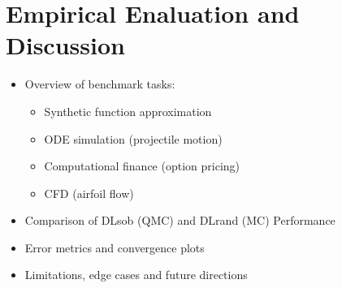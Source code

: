 \chapter{Empirical Enaluation and Discussion}

\begin{itemize}
    \item Overview of benchmark tasks:
    \begin{itemize}
        \item Synthetic function approximation
        \item ODE simulation (projectile motion)
        \item Computational finance (option pricing)
        \item CFD (airfoil flow)
    \end{itemize}
    \item Comparison of DLsob (QMC) and DLrand (MC) Performance
    \item Error metrics and convergence plots
    \item Limitations, edge cases and future directions
\end{itemize}